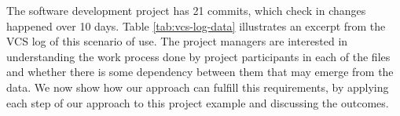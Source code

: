 The software development project has 21 commits, which check in changes happened over 10 days. Table \ref{tab:vcs-log-data} illustrates an excerpt from the VCS log of this scenario of use. The project managers are interested in understanding the work process done by project participants in each of the files and whether there is some dependency between them that may emerge from the data. We now show how our approach can fulfill this requirements, by applying  each step of our approach to this project example and discussing the outcomes.







%

